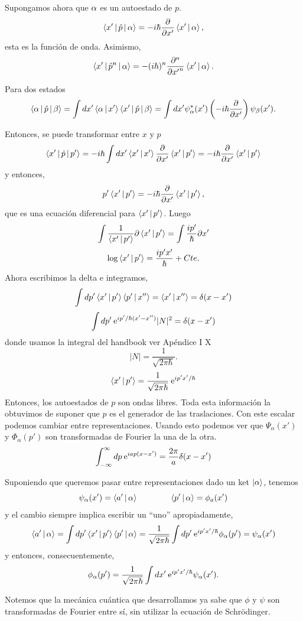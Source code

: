 \documentclass[10pt,oneside]{CBFT_book}
\begin{document}
Supongamos ahora que $\a$ es un autoestado de $p$. 
\[
	\Braket{x'|\hat{p}|\a} = - i \hbar \dpar{}{x'} \Braket{x'|\a},
\]
esta es la función de onda. Asimismo,
\[
	\Braket{x'|\hat{p}^n|\a} = - ( i \hbar )^n \dpar[n]{}{x'} \Braket{x'|\a}.
\]

Para dos estados 
\[
	\Braket{\a|\hat{p}|\b} = \int dx' \Braket{\a|x'}\Braket{x'|\hat{p}|\b} =
	\int dx' \psi^*_\a(x') \left( - i \hbar \dpar{}{x'} \right) \psi_\b(x').
\]

Entonces, se puede transformar entre $x$ y $p$
\[
	\Braket{x'|\hat{p}|p'} =  -i\hbar \int dx'  \Braket{x'|x'} \dpar{}{x'} \Braket{x'|p'} =
	-i\hbar \dpar{}{x'} \Braket{x'|p'}
\]
y entonces,
\[
	p' \Braket{x'|p'} = -i\hbar \dpar{}{x'} \Braket{x'|p'},
\]
que es una ecuación diferencial para $\Braket{x'|p'}$. Luego
\[
	\int  \frac{1}{\Braket{x'|p'}} \partial \Braket{x'|p'} = 
	\int \frac{ip'}{\hbar} \partial x'
\]
\[
	\log \Braket{x'|p'} = \frac{ip'x'}{\hbar} + Cte.
\]
Ahora escribimos la delta e integramos,
\[
	\int dp' \Braket{x'|p'} \Braket{p'|x''} = \Braket{x'|x''} = \delta(x-x')
\]
\[
	\int dp' \euler^{ip'/\hbar(x'-x'')} |N|^2 = \delta(x-x')
\]
donde usamos la integral del handbook ver Apéndice I X
\[
	|N| = \frac{1}{\sqrt{2\pi\hbar}}.
\]
\[
	\Braket{x'|p'} = \frac{1}{\sqrt{2\pi\hbar}} \euler^{i p'x'/\hbar}
\]
Entonces, los autoestados de $p$ son ondas libres. Toda esta información la obtuvimos
de suponer que $p$ es el generador de las traslaciones.
Con este escalar podemos cambiar entre representaciones.
Usando esto podemos ver que $\Psi_\alpha(x')$ y $\Phi_\alpha(p')$ son transformadas 
de Fourier la una de la otra.
\[
	 \int_{-\infty}^\infty dp \euler^{iap(x-x')} = \frac{2\pi}{a}\delta(x-x')
\]

Suponiendo que queremos pasar entre representaciones dado un ket $\Ket{\a}$, tenemos
\[
	\psi_\a(x') =  \Braket{a'|\a} \qquad \qquad \Braket{p'|\a} = \phi_a(x')
\]
y el cambio siempre implica escribir un ``uno'' apropiadamente,
\[
	\Braket{a'|\a} = \int dp' \Braket{x'|p'} \Braket{p'|\a} =
	\frac{1}{\sqrt{2\pi\hbar}} \int dp' \euler^{i p' x' / \hbar} \phi_\a (p') = \psi_\a(x')
\]
y entonces, consecuentemente,
\[
	\phi_\a (p') = \frac{1}{\sqrt{2\pi\hbar}} \int dx' \euler^{i p' x' / \hbar}  \psi_\a(x').
\]

Notemos que la mecánica cuántica que desarrollamos ya sabe que $\phi$ y $\psi$ son
transformadas de Fourier entre sí, sin utilizar la ecuación de Schrödinger.
\end{document}
